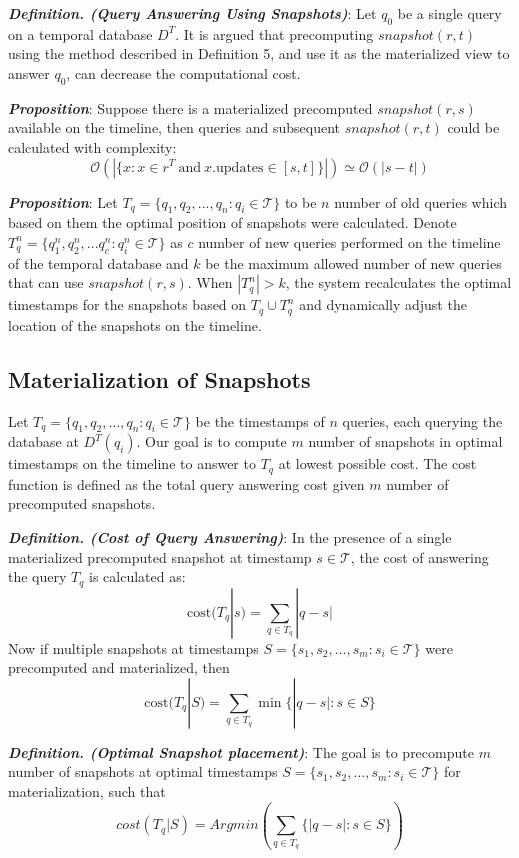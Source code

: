\textbf{\emph{Definition. (Query Answering Using Snapshots)}}: Let $q_0$ be a single query on a temporal database $D^T$. It is argued that precomputing $snapshot(r,t)$ using the method described in Definition 5, and use it as the materialized view to answer $q_0$, can decrease the computational cost.

\textbf{\emph{Proposition}}: Suppose there is a materialized precomputed $snapshot(r,s)$ available on the timeline, then queries and subsequent $snapshot(r,t)$ could be calculated with complexity:
$$\mathcal{O}(|\{x: x\in r^T\mathrm{\ and\ } x.\mathrm{updates} \in [s,
t]\}|) \simeq \mathcal{O}(|s-t|)$$

\textbf{\emph{Proposition}}:  Let $T_q = \{q_1,q_2,...,q_n : q_i \in \mathcal{T}\}$ to be $n$ number of old queries which based on them the optimal position of snapshots were calculated. Denote $T_q^n=\{q_1^n,q_2^n,...q_c^n:q_i^n \in \mathcal{T}\}$ as $c$ number of new queries performed on the timeline of the temporal database and $k$ be the maximum allowed number of new queries that can use $snapshot(r,s)$. When $|T_q^n|>k$, the system recalculates the optimal timestamps for the snapshots based on $T_q \cup T_q^n$ and dynamically adjust the location of the snapshots on the timeline.

\subsection{Materialization of Snapshots}
Let $T_q = \{q_1, q_2, \dots, q_n :q_i \in \mathcal{T}\}$ be the timestamps of $n$ queries, each 
querying the database at $D^T(q_i)$. Our goal is to compute $m$ number of snapshots in optimal timestamps on the timeline to answer to $T_q$ at lowest possible cost. The cost function is defined as the total query answering cost given $m$ number of precomputed snapshots.

\textbf{\emph{Definition. (Cost of Query Answering)}}: In the presence of a single materialized precomputed snapshot at timestamp $s \in \mathcal{T}$, the cost of answering the query $T_q$ is calculated as:
$$\mathrm{cost}(T_q | s) = \sum_{q\in T_q} |q - s|$$
Now if multiple snapshots at timestamps $S=\{s_1, s_2, \dots, s_m : s_i \in \mathcal{T}\}$ were precomputed and materialized, then 
$$\mathrm{cost}(T_q|S) = \sum_{q\in T_q} \min\{|q-s| : s\in S\}$$


\textbf{\emph{Definition. (Optimal Snapshot placement)}}: The goal is to precompute $m$ number of snapshots at optimal timestamps $S=\{s_1, s_2, \dots, s_m: s_i \in \mathcal{T}\}$ for materialization, such that 
$$cost(T_q|S)= Arg min(\sum_{q\in T_q}\{|q - s|:s \in S\})$$

